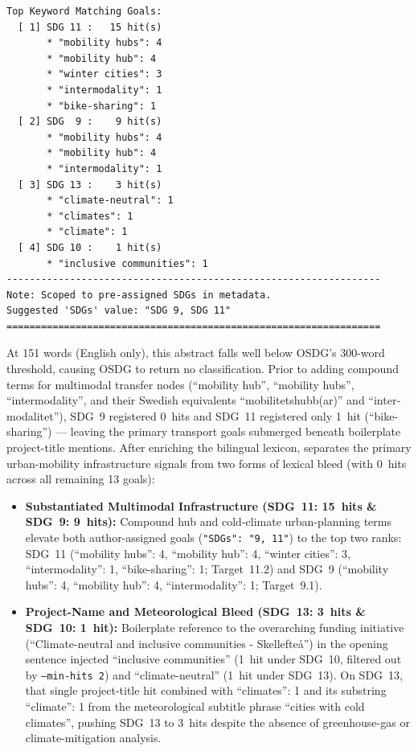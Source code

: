 \begin{casestudySection}
\begin{lstlisting}
Top Keyword Matching Goals:
  [ 1] SDG 11 :   15 hit(s)
       * "mobility hubs": 4
       * "mobility hub": 4
       * "winter cities": 3
       * "intermodality": 1
       * "bike-sharing": 1
  [ 2] SDG  9 :    9 hit(s)
       * "mobility hubs": 4
       * "mobility hub": 4
       * "intermodality": 1
  [ 3] SDG 13 :    3 hit(s)
       * "climate-neutral": 1
       * "climates": 1
       * "climate": 1
  [ 4] SDG 10 :    1 hit(s)
       * "inclusive communities": 1
-----------------------------------------------------------------
Note: Scoped to pre-assigned SDGs in metadata.
Suggested 'SDGs' value: "SDG 9, SDG 11"
=================================================================
\end{lstlisting}

At \num{151} words (English only), this abstract falls well below OSDG's \num{300}-word threshold, causing OSDG to return no classification. Prior to adding compound terms for multimodal transfer nodes (\enquote{mobility hub}, \enquote{mobility hubs}, \enquote{intermodality}, and their Swedish equivalents \enquote{\foreignlanguage{swedish}{mobilitetshubb(ar)}} and \enquote{\foreignlanguage{swedish}{intermodalitet}}), \gls{SDG}~9 registered \num{0}~hits and \gls{SDG}~11 registered only \num{1}~hit (\enquote{bike-sharing}) --- leaving the primary transport goals submerged beneath boilerplate project-title mentions. After enriching the bilingual lexicon,  separates the primary urban-mobility infrastructure signals from two forms of lexical bleed (with \num{0}~hits across all remaining \num{13} goals):
\begin{itemize}
    \item \textbf{Substantiated Multimodal Infrastructure (\gls{SDG}~11: \num{15}~hits \& \gls{SDG}~9: \num{9}~hits):} Compound hub and cold-climate urban-planning terms elevate both author-assigned goals (\texttt{"SDGs": "9, 11"}) to the top two ranks: \gls{SDG}~11 (\enquote{mobility hubs}: 4, \enquote{mobility hub}: 4, \enquote{winter cities}: 3, \enquote{intermodality}: 1, \enquote{bike-sharing}: 1; Target~11.2) and \gls{SDG}~9 (\enquote{mobility hubs}: 4, \enquote{mobility hub}: 4, \enquote{intermodality}: 1; Target~9.1).

    \item \textbf{Project-Name and Meteorological Bleed (\gls{SDG}~13: \num{3}~hits \& \gls{SDG}~10: \num{1}~hit):} Boilerplate reference to the overarching funding initiative (\enquote{Climate-neutral and inclusive communities - Skellefteå}) in the opening sentence injected \enquote{inclusive communities} (\num{1}~hit under \gls{SDG}~10, filtered out by \texttt{--min-hits 2}) and \enquote{climate-neutral} (\num{1}~hit under \gls{SDG}~13). On \gls{SDG}~13, that single project-title hit combined with \enquote{climates}: 1 and its substring \enquote{climate}: 1 from the meteorological subtitle phrase \enquote{cities with cold climates}, pushing \gls{SDG}~13 to \num{3}~hits despite the absence of greenhouse-gas or climate-mitigation analysis.
\end{itemize}
\end{casestudySection}

